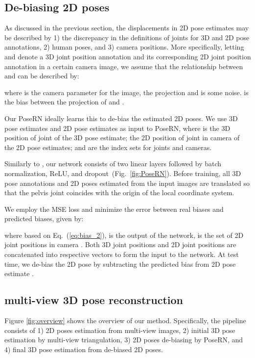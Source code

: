 \documentclass{article}
\newcommand{\figref}[1]{{Fig.~\ref{fig:#1}}}
\begin{document}
\subsection{De-biasing 2D poses}
\label{sec:debias}
\vspace{-0.1cm}

As discussed in the previous section, the displacements in 2D pose estimates may be described by 1) the discrepancy in the definitions of joints for 3D and 2D pose annotations, 2) human poses, and 3) camera positions. More specifically, letting  and  denote a 3D joint position annotation and its corresponding 2D joint position annotation in a certain camera image, we assume that the relationship between  and  can be described by:

where  is the camera parameter for the image,  the projection and  is some noise.
 is the bias between the projection of  and .

Our PoseRN ideally learns this  to de-bias the estimated 2D poses. 
We use 3D pose estimates  and 2D pose estimates  as input to PoseRN, where  is the 3D position of joint  of the 3D pose estimate;  the 2D position of joint  in camera  of the 2D pose estimates;  and  are the index sets for joints and cameras.

Similarly to \cite{Martinez_2017_ICCV}, our network consists of two linear layers followed by batch normalization, ReLU, and dropout~(\figref{PoseRN}).
Before training, all 3D pose annotations and 2D poses estimated from the input images are translated so that the pelvis joint coincides with the origin of the local coordinate system. 

We employ the MSE loss and minimize the error between real biases and predicted biases, given by:

where  based on Eq.~(\ref{eq:bias_2}),  is the output of the network,  is the set of 2D joint positions in camera .
Both 3D joint positions and 2D joint positions are concatenated into respective vectors to form the input to the network. At test time, we de-bias the 2D pose by subtracting the predicted bias from 2D pose estimate . 

\vspace{-0.2cm}
\subsection{multi-view 3D pose reconstruction}
\label{sec:MV3Dpose}

Figure \ref{fig:overview} shows the overview of our method. Specifically, the pipeline consists of 1) 2D poses estimation from multi-view images, 2) 
initial 3D pose estimation by multi-view triangulation,
3) 2D poses de-biasing by PoseRN, and 4) final 3D pose estimation from de-biased 2D poses.
\end{document}
